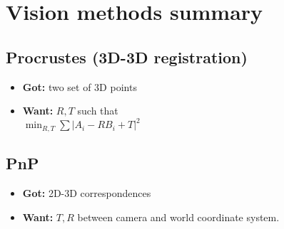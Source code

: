 \section{Vision methods summary}
\subsection*{Procrustes (3D-3D registration)}
\begin{itemize}
  \item \textbf{Got:} two set of 3D points
  \item \textbf{Want:} $R, T$ such that\\
    $\min_{R,T} \sum |A_i - R B_i +T|^2$
\end{itemize}
\subsection*{PnP}
\begin{itemize}
  \item \textbf{Got:} 2D-3D correspondences
  \item \textbf{Want:} $T, R$ between camera and world coordinate
    system.
\end{itemize}
